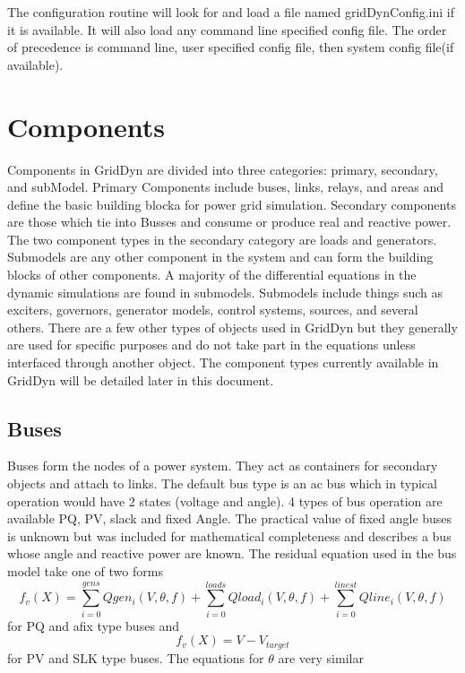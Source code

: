 \documentclass[12pt]{article} %
\begin{document}
The configuration routine will look for and load a file named gridDynConfig.ini if it is available.  It will also load any command line specified config file.  The order of precedence is command line, user specified config file, then system config file(if available).   

    

\section{Components}
Components in GridDyn are divided into three categories:  primary, secondary, and subModel.  Primary Components include buses, links, relays, and areas and define the basic building blocka for power grid simulation.  Secondary components are those which tie into Busses and consume or produce real and reactive power.  The two component types in the secondary category are loads and generators.  Submodels are any other component in the system and can form the building blocks of other components.  A majority of the differential equations in the dynamic simulations are found in submodels.  Submodels include things such as exciters, governors, generator models, control systems,  sources,  and several others.  There are a few other types of objects used in GridDyn but they generally are used for specific purposes and do not take part in the equations unless interfaced through another object.  The component types currently available in GridDyn will be detailed later in this document.  

\subsection{Buses}
Buses form the nodes of a power system.  They act as containers for secondary objects and attach to links.   The default bus type is an ac bus which in typical operation would have 2 states (voltage and angle).  4 types of bus operation are available PQ, PV, slack and fixed Angle.  The practical value of fixed angle buses is unknown but was included for mathematical completeness and describes a bus whose angle and reactive power are known.  The residual equation used in the bus model take one of two forms
\begin{equation}
f_v(X)=\sum_{i=0}^{gens}Qgen_i(V,\theta,f)+\sum_{i=0}^{loads}Qload_i(V,\theta,f)+\sum_{i=0}^{linest}Qline_i(V,\theta,f)
\end{equation}
for PQ and afix type buses and 
\begin{equation}
f_v(X)=V-V_{target}
\end{equation}
for PV and SLK type buses.
The equations for $\theta$ are very similar
\end{document}
